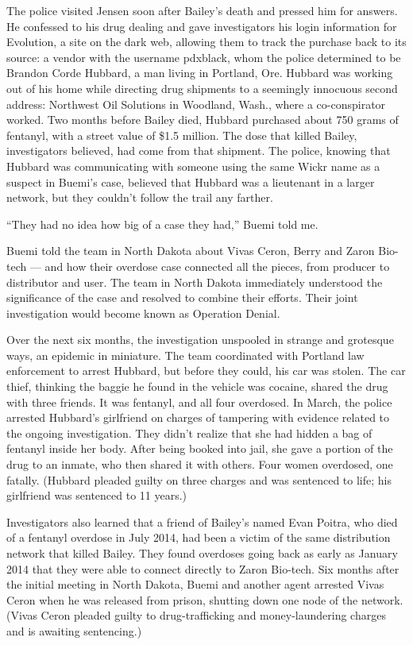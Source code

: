 The police visited Jensen soon after Bailey's death and pressed him for
answers. He confessed to his drug dealing and gave investigators his
login information for Evolution, a site on the dark web, allowing them
to track the purchase back to its source: a vendor with the username
pdxblack, whom the police determined to be Brandon Corde Hubbard, a man
living in Portland, Ore. Hubbard was working out of his home while
directing drug shipments to a seemingly innocuous second address:
Northwest Oil Solutions in Woodland, Wash., where a co-conspirator
worked. Two months before Bailey died, Hubbard purchased about 750 grams
of fentanyl, with a street value of \$1.5 million. The dose that killed
Bailey, investigators believed, had come from that shipment. The police,
knowing that Hubbard was communicating with someone using the same Wickr
name as a suspect in Buemi's case, believed that Hubbard was a
lieutenant in a larger network, but they couldn't follow the trail any
farther.

``They had no idea how big of a case they had,'' Buemi told me.

Buemi told the team in North Dakota about Vivas Ceron, Berry and Zaron
Bio-tech --- and how their overdose case connected all the pieces, from
producer to distributor and user. The team in North Dakota immediately
understood the significance of the case and resolved to combine their
efforts. Their joint investigation would become known as Operation
Denial.

Over the next six months, the investigation unspooled in strange and
grotesque ways, an epidemic in miniature. The team coordinated with
Portland law enforcement to arrest Hubbard, but before they could, his
car was stolen. The car thief, thinking the baggie he found in the
vehicle was cocaine, shared the drug with three friends. It was
fentanyl, and all four overdosed. In March, the police arrested
Hubbard's girlfriend on charges of tampering with evidence related to
the ongoing investigation. They didn't realize that she had hidden a bag
of fentanyl inside her body. After being booked into jail, she gave a
portion of the drug to an inmate, who then shared it with others. Four
women overdosed, one fatally. (Hubbard pleaded guilty on three charges
and was sentenced to life; his girlfriend was sentenced to 11 years.)

Investigators also learned that a friend of Bailey's named Evan Poitra,
who died of a fentanyl overdose in July 2014, had been a victim of the
same distribution network that killed Bailey. They found overdoses going
back as early as January 2014 that they were able to connect directly to
Zaron Bio-tech. Six months after the initial meeting in North Dakota,
Buemi and another agent arrested Vivas Ceron when he was released from
prison, shutting down one node of the network. (Vivas Ceron pleaded
guilty to drug-trafficking and money-laundering charges and is awaiting
sentencing.)

